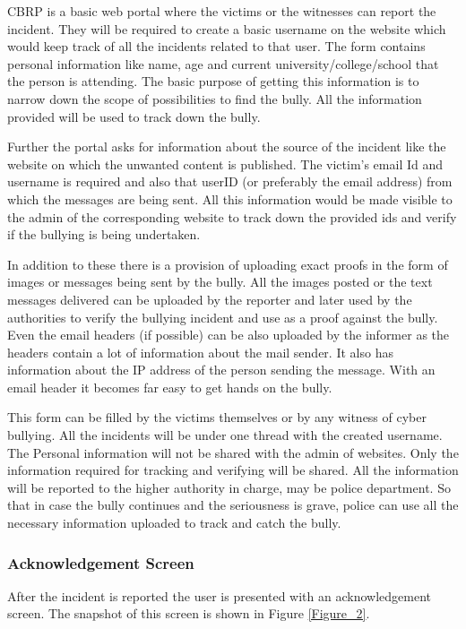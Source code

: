 CBRP is a basic web portal where the victims or the witnesses can report the incident. They will be required to create a basic username on the website which would keep track of all the incidents related to that user. The form contains personal information like name, age and current university/college/school that the person is attending. The basic purpose of getting this information is to narrow down the scope of possibilities to find the bully. All the information provided will be used to track down the bully.
 
Further the portal asks for information about the source of the incident like the website on which the unwanted content is published. The victim’s email Id and username is required and also that userID (or preferably the email address) from which the messages are being sent. All this information would be made visible to the admin of the corresponding website to track down the provided ids and verify if the bullying is being undertaken.
 
In addition to these there is a provision of uploading exact proofs in the form of images or messages being sent by the bully. All the images posted or the text messages delivered can be uploaded by the reporter and later used by the authorities to verify the bullying incident and use as a proof against the bully. Even the email headers (if possible) can be also uploaded by the informer as the headers contain a lot of information about the mail sender. It also has information about the IP address of the person sending the message. With an email header it becomes far easy to get hands on the bully.

This form can be filled by the victims themselves or by any witness of cyber bullying. All the incidents will be under one thread with the created username. The Personal information will not be shared with the admin of websites. Only the information required for tracking and verifying will be shared. All the information will be reported to the higher authority in charge, may be police department. So that in case the bully continues and the seriousness is grave, police can use all the necessary information uploaded to track and catch the bully.

\subsubsection{Acknowledgement Screen}
After the incident is reported the user is presented with an acknowledgement screen. The snapshot of this screen is shown in Figure \ref{Figure_2}.


